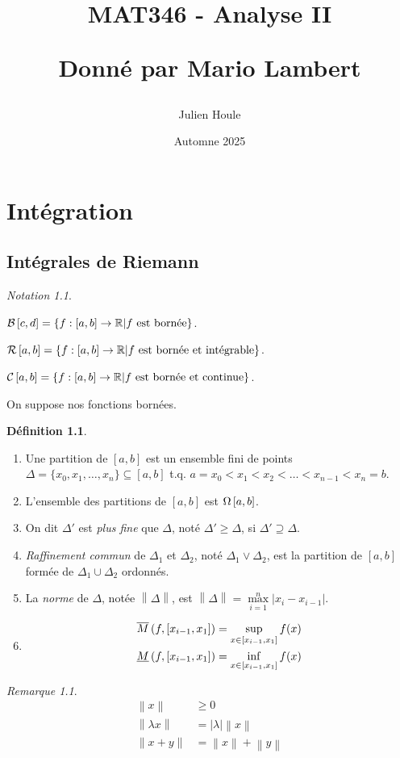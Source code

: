\documentclass{report}
\title{MAT346 - Analyse II

Donn\'e par Mario Lambert}
\author{Julien Houle}
\date{Automne 2025}
\newcommand*{\raffinement}[2]{#1 \vee #2}
\newcommand*{\norme}[1]{\left\| #1 \right\|}
\newcommand*{\abs}[1]{\left| #1 \right|}
\newcommand*{\reels}{\mathbb{R}}
\theoremstyle{definition}
\newtheorem*{defin}{D\'efinition}
\theoremstyle{remark}
\newtheorem*{nota}{Notation}
\newtheorem*{rema}{Remarque}
\begin{document}
	\maketitle
	\tableofcontents
	\newpage

	\chapter{Int\'egration}
	\section{Int\'egrales de Riemann}

	\begin{nota}
		~

		$\bornee[c,d]=\left\lbrace f:[a,b] \to \reels \middle| f \text{ est born\'ee} \right\rbrace$.

		$\riemann=\left\lbrace f:[a,b] \to \reels \middle| f \text{ est born\'ee et int\'egrable} \right\rbrace$.

		$\continue=\left\lbrace f:[a,b] \to \reels \middle| f \text{ est born\'ee et continue} \right\rbrace$.
	\end{nota}

	On suppose nos fonctions born\'ees.

	\begin{defin}
		~

		\begin{enumerate}[label=\alph*)]
			\item Une partition de $[a,b]$ est un ensemble fini de points $\Delta=\{x_0,x_1,\dotsc,x_n\} \subseteq [a,b]$ t.q. $a=x_0 < x_1 < x_2 < \dotsc < x_{n-1} < x_n=b$.
			\item L'ensemble des partitions de $[a,b]$ est $\partitions$.
			\item On dit $\Delta'$ est \emph{plus fine} que $\Delta$, not\'e $\Delta' \geq \Delta$, si $\Delta' \supseteq \Delta$.
			\item \emph{Raffinement commun} de $\Delta_1$ et $\Delta_2$, not\'e $\raffinement{\Delta_1}{\Delta_2}$, est la partition de $[a,b]$ form\'ee de $\Delta_1 \cup \Delta_2$ ordonn\'es.
			\item La \emph{norme} de $\Delta$, not\'ee $\norme{\Delta}$, est $\norme{\Delta}=\displaystyle\max\limits_{i=1}^{n}\abs{x_i-x_{i-1}}$.
			\item
			\begin{align*}
				\msup{f}[x_{i-1},x_1]&= \displaystyle\sup\limits_{x \in \left[ x_{i-1},x_1 \right]}f(x)\\
				\minf{f}[x_{i-1},x_1]&= \displaystyle\inf\limits_{x \in \left[ x_{i-1},x_1 \right]}f(x)
			\end{align*}
		\end{enumerate}
		\begin{rema}
			\begin{align*}
				\norme{x}&\geq0\\
				\norme{\lambda x}&=\abs{\lambda} \norme{x}\\
				\norme{x+y}&= \norme{x} + \norme{y}
			\end{align*}
		\end{rema}
	\end{defin}
\end{document}
